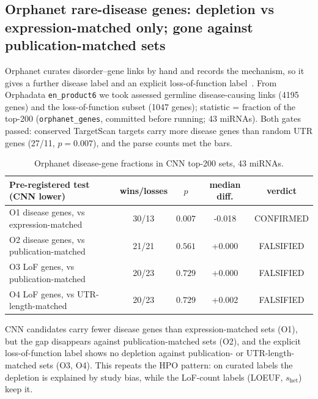 \subsection{Orphanet rare-disease genes: depletion vs expression-matched only; gone against publication-matched sets}
Orphanet curates disorder--gene links by hand and records the mechanism, so it gives a further disease label and an explicit loss-of-function label~\cite{orphanet}. From Orphadata \texttt{en\_product6} we took assessed germline disease-causing links (4195 genes) and the loss-of-function subset (1047 genes); statistic = fraction of the top-200 (\texttt{orphanet\_genes}, committed before running; 43 miRNAs). Both gates passed: conserved TargetScan targets carry more disease genes than random UTR genes (27/11, $p=0.007$), and the parse counts met the bars.
\begin{table}[h]\centering\small\begin{tabular}{lcccc}\hline Pre-registered test (CNN lower) & wins/losses & $p$ & median diff. & verdict\\\hline
O1 disease genes, vs expression-matched & 30/13 & $0.007$ & -0.018 & CONFIRMED \\
O2 disease genes, vs publication-matched & 21/21 & $0.561$ & +0.000 & FALSIFIED \\
O3 LoF genes, vs publication-matched & 20/23 & $0.729$ & +0.000 & FALSIFIED \\
O4 LoF genes, vs UTR-length-matched & 20/23 & $0.729$ & +0.002 & FALSIFIED \\
\hline\end{tabular}\caption{Orphanet disease-gene fractions in CNN top-200 sets, 43 miRNAs.}\label{tab:orphanet}\end{table}
CNN candidates carry fewer disease genes than expression-matched sets (O1), but the gap disappears against publication-matched sets (O2), and the explicit loss-of-function label shows no depletion against publication- or UTR-length-matched sets (O3, O4). This repeats the HPO pattern: on curated labels the depletion is explained by study bias, while the LoF-count labels (LOEUF, $s_\mathrm{het}$) keep it.
